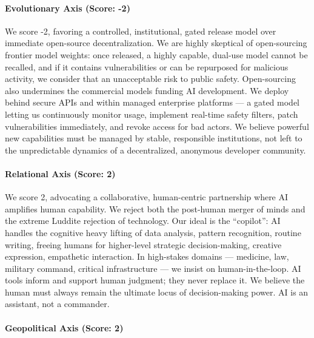 \paragraph{Evolutionary Axis (Score:
-2)}\label{evolutionary-axis-score--2-1}

We score -2, favoring a controlled, institutional, gated release model
over immediate open-source decentralization. We are highly skeptical of
open-sourcing frontier model weights: once released, a highly capable,
dual-use model cannot be recalled, and if it contains vulnerabilities or
can be repurposed for malicious activity, we consider that an
unacceptable risk to public safety. Open-sourcing also undermines the
commercial models funding AI development. We deploy behind secure APIs
and within managed enterprise platforms --- a gated model letting us
continuously monitor usage, implement real-time safety filters, patch
vulnerabilities immediately, and revoke access for bad actors. We
believe powerful new capabilities must be managed by stable, responsible
institutions, not left to the unpredictable dynamics of a decentralized,
anonymous developer community.

\paragraph{Relational Axis (Score: 2)}\label{relational-axis-score-2-4}

We score 2, advocating a collaborative, human-centric partnership where
AI amplifies human capability. We reject both the post-human merger of
minds and the extreme Luddite rejection of technology. Our ideal is the
``copilot'': AI handles the cognitive heavy lifting of data analysis,
pattern recognition, routine writing, freeing humans for higher-level
strategic decision-making, creative expression, empathetic interaction.
In high-stakes domains --- medicine, law, military command, critical
infrastructure --- we insist on human-in-the-loop. AI tools inform and
support human judgment; they never replace it. We believe the human must
always remain the ultimate locus of decision-making power. AI is an
assistant, not a commander.

\paragraph{Geopolitical Axis (Score:
2)}\label{geopolitical-axis-score-2-3}

